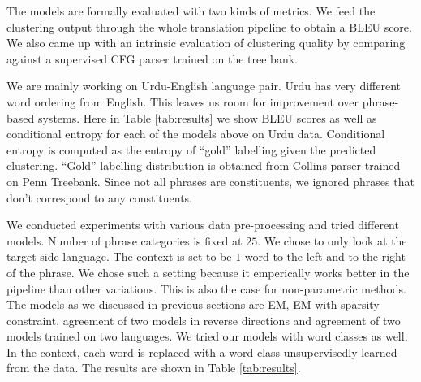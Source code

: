 The models are formally evaluated with two kinds
of metrics. We feed the clustering output
through the whole translation pipeline 
to obtain a BLEU score. We also came up 
with an intrinsic evaluation of clustering quality
by comparing against a supervised CFG parser trained on the
tree bank.

We are mainly working on Urdu-English language pair. 
Urdu has very 
different word ordering from English. 
This leaves us room for improvement over
phrase-based systems.
Here in Table \ref{tab:results} 
we show BLEU scores as well as
conditional entropy for each of the models above
on Urdu data. Conditional entropy is computed
as the entropy of ``gold'' labelling given
the predicted clustering. ``Gold'' labelling
distribution
is obtained from Collins parser
trained on Penn Treebank. Since not
all phrases are constituents, we ignored
phrases that don't correspond to any constituents.

We conducted experiments with various data pre-processing
and tried different models. Number of phrase categories
is fixed at $25$. We chose to only look at
the target side language. The context is set
to be $1$ word to the left and to the right of the phrase.
We chose such a setting because it emperically works better
in the pipeline than other variations. This is also
the case for non-parametric methods. The models as we discussed
in previous sections are EM, EM with sparsity constraint, 
agreement of two models in reverse directions and agreement
of two models trained on two languages. We tried our models
with word classes as well. In the context, each word is
replaced with a word class unsupervisedly learned from the data.
The results are shown in Table \ref{tab:results}.

